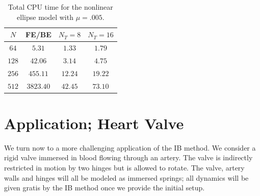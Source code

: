 \documentclass[preprint,12pt]{elsarticle}
\begin{document}
\begin{table}
\caption{Total CPU time for the nonlinear ellipse model with $\mu=.005$.}
\label{table:NonlinearEllipseSims_005CPU}
\begin{center}
\begin{tabular}{|c|c| c c|}
\hline
$N$ & FE/BE & $N_T = 8$ & $N_T = 16$\\
\hline
$64$ & $5.31$ & $1.33$ & $1.79$ \\
$128$ & $42.06$ & $3.14$ & $4.75$ \\
$256$ & $455.11$ & $12.24$ & $19.22$ \\
$512$ & $3823.40$ & $42.45$ & $73.10$ \\
\hline
\end{tabular}
\end{center}
\end{table}





\section{Application; Heart Valve}
\label{Sec:valve}
We turn now to a more challenging application of the IB method. We consider a rigid valve immersed in blood flowing through an artery. The valve is indirectly restricted in motion by two hinges but is allowed to rotate. The valve, artery walls and hinges will all be modeled as immersed springs; all dynamics will be given gratis by the IB method once we provide the initial setup.
\end{document}
